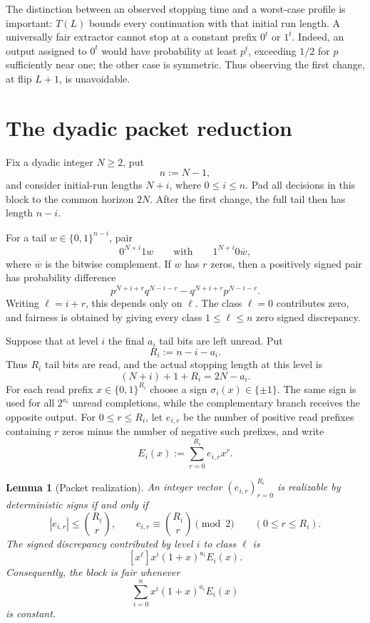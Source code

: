 \documentclass[11pt]{article}
\newtheorem{lemma}[theorem]{Lemma}
\theoremstyle{definition}
\theoremstyle{remark}
\begin{document}
The distinction between an observed stopping time and a worst-case profile
is important: $T(L)$ bounds every continuation with that initial run length.
A universally fair extractor cannot stop at a constant prefix $0^t$ or
$1^t$. Indeed, an output assigned to $0^t$ would have probability at least
$p^t$, exceeding $1/2$ for $p$ sufficiently near one; the other case is
symmetric. Thus observing the first change, at flip $L+1$, is unavoidable.

\section{The dyadic packet reduction}

Fix a dyadic integer $N\ge2$, put
\[
 n:=N-1,
\]
and consider initial-run lengths $N+i$, where $0\le i\le n$.  Pad all decisions in this block to the common horizon $2N$.  After the first change, the full tail then has length $n-i$.

For a tail $w\in\{0,1\}^{n-i}$, pair
\[
 0^{N+i}1w
 \qquad\text{with}\qquad
 1^{N+i}0\overline w,
\]
where $\overline w$ is the bitwise complement.  If $w$ has $r$ zeros, then a positively signed pair has probability difference
\[
 p^{N+i+r}q^{N-i-r}-q^{N+i+r}p^{N-i-r}.
\]
Writing $\ell=i+r$, this depends only on $\ell$.  The class $\ell=0$ contributes zero, and fairness is obtained by giving every class $1\le\ell\le n$ zero signed discrepancy.

Suppose that at level $i$ the final $a_i$ tail bits are left unread.  Put
\[
 R_i:=n-i-a_i.
\]
Thus $R_i$ tail bits are read, and the actual stopping length at this
level is
\[
 (N+i)+1+R_i=2N-a_i.
\]
For each read prefix $x\in\{0,1\}^{R_i}$ choose a sign
$\sigma_i(x)\in\{\pm1\}$.  The same sign is used for all $2^{a_i}$ unread completions, while the complementary branch receives the opposite output.  For $0\le r\le R_i$, let $e_{i,r}$ be the number of positive read prefixes containing $r$ zeros minus the number of negative such prefixes, and write
\[
 E_i(x):=\sum_{r=0}^{R_i}e_{i,r}x^r.
\]

\begin{lemma}[Packet realization]\label{lem:packet-realization}
An integer vector $(e_{i,r})_{r=0}^{R_i}$ is realizable by deterministic signs if and only if
\begin{equation}\label{eq:packet-admissibility-e}
 |e_{i,r}|\le\binom{R_i}{r},
 \qquad
 e_{i,r}\equiv\binom{R_i}{r}\pmod2
 \qquad(0\le r\le R_i).
\end{equation}
The signed discrepancy contributed by level $i$ to class $\ell$ is
\[
 [x^\ell]x^i(1+x)^{a_i}E_i(x).
\]
Consequently, the block is fair whenever
\begin{equation}\label{eq:x-identity}
 \sum_{i=0}^{n}x^i(1+x)^{a_i}E_i(x)
\end{equation}
is constant.
\end{lemma}
\end{document}
